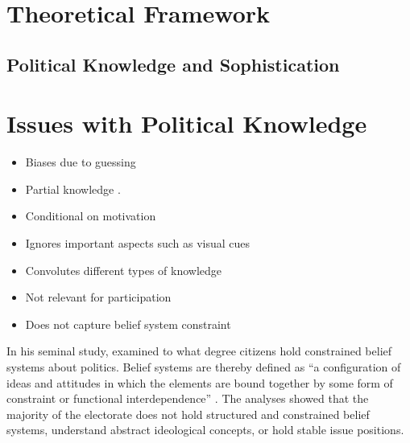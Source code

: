 \documentclass[12pt]{article}
\begin{document}
\clearpage

\section{Theoretical Framework}

\subsection{Political Knowledge and Sophistication}

\section*{Issues with Political Knowledge}
\begin{itemize}
   \item Biases due to guessing \citep[e.g.][]{mondak2004knowledge}
   \item Partial knowledge \citep[e.g.][]{debell2013harder}.
   \item Conditional on motivation \citep[e.g.][]{prior2008money}
   \item Ignores important aspects such as visual cues \citep{prior2014visual}
   \item Convolutes different types of knowledge \citep{barabas2014question}
   \item Not relevant for participation \citep{lupia2006elitism}
   \item Does not capture belief system constraint \citep{luskin1987measuring,tetlock1983cognitive}
\end{itemize}

In his seminal study, \citet{converse1964nature} examined to what degree citizens hold constrained belief systems about politics. Belief systems are thereby defined as ``a configuration of ideas and attitudes in which the elements are bound together by some form of constraint or functional interdependence'' \citep[207]{converse1964nature}. The analyses showed that the majority of the electorate does not hold structured and constrained belief systems, understand abstract ideological concepts, or hold stable issue positions. 
\end{document}
